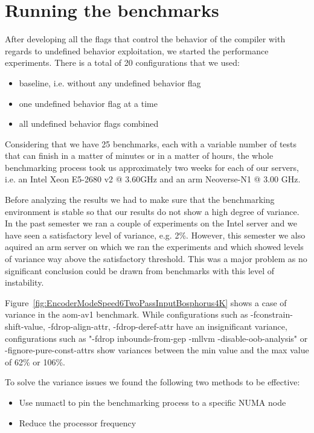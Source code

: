 \section{Running the benchmarks}

After developing all the flags that control the behavior of the compiler with
regards to undefined behavior exploitation, we started the performance
experiments. There is a total of 20 configurations that we used:
\begin{itemize}
  \item baseline, i.e. without any undefined behavior flag
  \item one undefined behavior flag at a time
  \item all undefined behavior flags combined
\end{itemize}

Considering that we have 25 benchmarks, each with a variable number of tests
that can finish in a matter of minutes or in a matter of hours, the whole
benchmarking process took us approximately two weeks for each of our servers,
i.e. an Intel Xeon E5-2680 v2 @ 3.60GHz and an arm Neoverse-N1 @ 3.00 GHz.

Before analyzing the results we had to make sure that the benchmarking
environment is stable so that our results do not show a high degree of variance.
In the past semester we ran a couple of experiments on the Intel server and we
have seen a satisfactory level of variance, e.g. 2\%. However, this semester we
also aquired an arm server on which we ran the experiments and which showed
levels of variance way above the satisfactory threshold. This was a major
problem as no significant conclusion could be drawn from benchmarks with this
level of instability.

Figure~\ref{fig:EncoderModeSpeed6TwoPassInputBosphorus4K} shows a case of
variance in the aom-av1 benchmark. While configurations such as
-fconstrain-shift-value, -fdrop-align-attr, -fdrop-deref-attr have an
insignificant variance, configurations such as "-fdrop inbounds-from-gep -mllvm
-disable-oob-analysis" or -fignore-pure-const-attrs show variances between the
min value and the max value of 62\% or 106\%.

To solve the variance issues we found the following two methods to be effective:
\begin{itemize}
  \item Use numactl to pin the benchmarking process to a specific NUMA node
  \item Reduce the processor frequency
\end{itemize}

